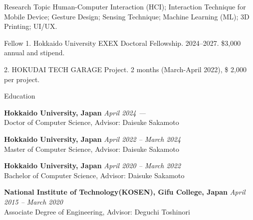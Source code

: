 \documentclass[
	11pt, %
]{resume} %
\begin{document}
\begin{rSection}{Research Topic}
Human-Computer Interaction (HCI); Interaction Technique for Mobile Device; Gesture Design; Sensing Technique; Machine Learning (ML); 3D Printing; UI/UX.
\end{rSection}
\begin{rSection}{Fellow}
1. Hokkaido University EXEX Doctoral Fellowship. 2024--2027. \$3,000 annual and stipend.

2. HOKUDAI TECH GARAGE Project. 2 months (March-April 2022), \$ 2,000 per project.
\end{rSection}

\begin{rSection}{Education}
	
	\textbf{Hokkaido University, Japan} \hfill \textit{April 2024 ---} \\ 
	Doctor of Computer Science, Advisor: Daisuke Sakamoto 
    
    \textbf{Hokkaido University, Japan} \hfill \textit{April 2022 -- March 2024} \\ 
	Master of Computer Science, Advisor: Daisuke Sakamoto 

    \textbf{Hokkaido University, Japan} \hfill \textit{April 2020 -- March 2022} \\ 
	Bachelor of Computer Science, Advisor: Daisuke Sakamoto 

    \textbf{National Institute of Technology(KOSEN), Gifu College, Japan} \hfill \textit{April 2015 -- March 2020} \\ 
	Associate Degree of Engineering, Advisor: Deguchi Toshinori
    	
\end{rSection}
\end{document}

